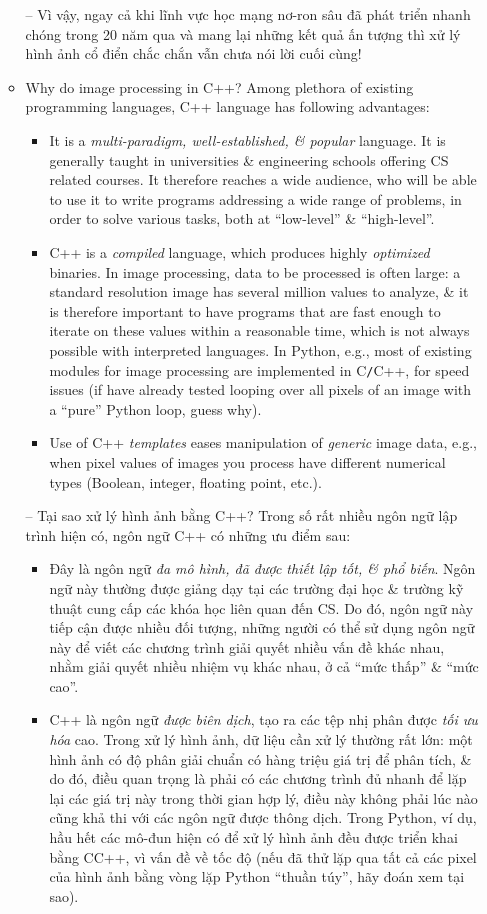 \documentclass{article}
\begin{document}
\begin{itemize}
\begin{itemize}
        -- Vì vậy, ngay cả khi lĩnh vực học mạng nơ-ron sâu đã phát triển nhanh chóng trong 20 năm qua và mang lại những kết quả ấn tượng thì xử lý hình ảnh cổ điển chắc chắn vẫn chưa nói lời cuối cùng!
        \item {\sf Why do image processing in C++?} Among plethora of existing programming languages, C++ language has following advantages:
        \begin{itemize}
            \item It is a {\it multi-paradigm, well-established, \& popular} language. It is generally taught in universities \& engineering schools offering CS related courses. It therefore reaches a wide audience, who will be able to use it to write programs addressing a wide range of problems, in order to solve various tasks, both at ``low-level'' \& ``high-level''.
            \item C++ is a {\it compiled} language, which produces highly {\it optimized} binaries. In image processing, data to be processed is often large: a standard resolution image has several million values to analyze, \& it is therefore important to have programs that are fast enough to iterate on these values within a reasonable time, which is not always possible with interpreted languages. In Python, e.g., most of existing modules for image processing are implemented in C{\tt/}C++, for speed issues (if have already tested looping over all pixels of an image with a ``pure'' Python loop, guess why).
            \item Use of C++ {\it templates} eases manipulation of {\it generic} image data, e.g., when pixel values of images you process have different numerical types (Boolean, integer, floating point, etc.).
        \end{itemize}
        -- {\sf Tại sao xử lý hình ảnh bằng C++?} Trong số rất nhiều ngôn ngữ lập trình hiện có, ngôn ngữ C++ có những ưu điểm sau:
        \begin{itemize}
            \item Đây là ngôn ngữ {\it đa mô hình, đã được thiết lập tốt, \& phổ biến}. Ngôn ngữ này thường được giảng dạy tại các trường đại học \& trường kỹ thuật cung cấp các khóa học liên quan đến CS. Do đó, ngôn ngữ này tiếp cận được nhiều đối tượng, những người có thể sử dụng ngôn ngữ này để viết các chương trình giải quyết nhiều vấn đề khác nhau, nhằm giải quyết nhiều nhiệm vụ khác nhau, ở cả ``mức thấp'' \& ``mức cao''.
            \item C++ là ngôn ngữ {\it được biên dịch}, tạo ra các tệp nhị phân được {\it tối ưu hóa} cao. Trong xử lý hình ảnh, dữ liệu cần xử lý thường rất lớn: một hình ảnh có độ phân giải chuẩn có hàng triệu giá trị để phân tích, \& do đó, điều quan trọng là phải có các chương trình đủ nhanh để lặp lại các giá trị này trong thời gian hợp lý, điều này không phải lúc nào cũng khả thi với các ngôn ngữ được thông dịch. Trong Python, ví dụ, hầu hết các mô-đun hiện có để xử lý hình ảnh đều được triển khai bằng C{\tt}C++, vì vấn đề về tốc độ (nếu đã thử lặp qua tất cả các pixel của hình ảnh bằng vòng lặp Python ``thuần túy'', hãy đoán xem tại sao).

\end{itemize}
\end{itemize}
\end{itemize}
\end{document}
